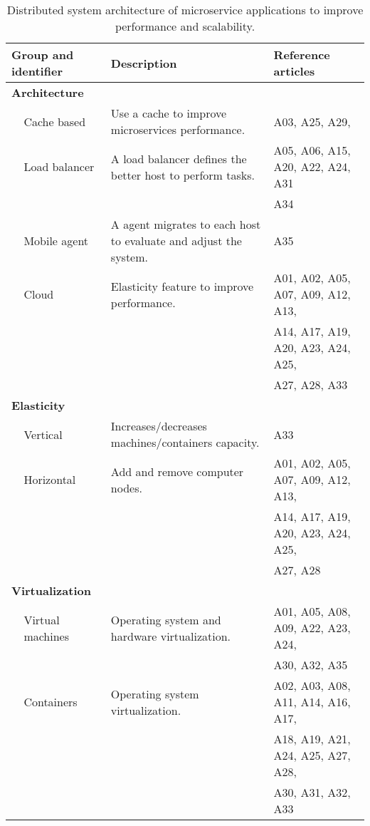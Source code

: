 \begin{table*}[tb]
\centering
\renewcommand{\arraystretch}{1.8}
\caption{Distributed system architecture of microservice applications to improve performance and scalability.}
\label{table_SG3}
\begin{tabular}{llll}
\hline
\multicolumn{2}{l}{Group and identifier} & Description & Reference articles \\ \hline

\multicolumn{2}{l}{\textbf{Architecture}} &  &  \\
 & Cache based & Use a cache to improve microservices performance. & A03, A25, A29, \\
 & Load balancer & A load balancer defines the better host to perform tasks. & A05, A06, A15, A20, A22, A24, A31 \\
 &  &  & A34 \\
 & Mobile agent & A agent migrates to each host to evaluate and adjust the system. & A35 \\
 & Cloud & Elasticity feature to improve performance. & A01, A02, A05, A07, A09, A12, A13, \\
 &  &  & A14, A17, A19, A20, A23, A24, A25, \\
 &  &  & A27, A28, A33 \\
 
\multicolumn{2}{l}{\textbf{Elasticity}} &  &  \\
 & Vertical & Increases/decreases machines/containers capacity. & A33 \\
 & Horizontal & Add and remove computer nodes. & A01, A02, A05, A07, A09, A12, A13, \\
 &  &  & A14, A17, A19, A20, A23, A24, A25, \\
 &  &  & A27, A28 \\
 
\multicolumn{2}{l}{\textbf{Virtualization}} &  &  \\
 & Virtual machines & Operating system and hardware virtualization. & A01, A05, A08, A09,  A22, A23, A24, \\
 &  &  & A30, A32, A35 \\
 & Containers & Operating system virtualization. & A02, A03, A08, A11, A14, A16, A17, \\
 &  &  & A18, A19, A21, A24, A25, A27, A28, \\
 &  &  & A30, A31, A32, A33 \\ \hline
\end{tabular}
\end{table*}